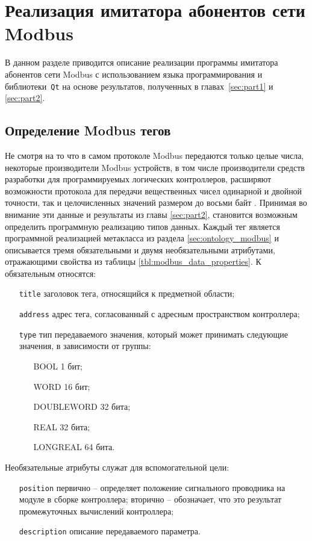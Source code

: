 \chapter{Реализация имитатора абонентов сети Modbus}
В данном разделе приводится описание реализации программы имитатора абонентов сети Modbus
с использованием языка программирования \cpp и библиотеки~\texttt{Qt}
на основе результатов, полученных в главах~\ref{sec:part1} и \ref{sec:part2}.


\section{Определение Modbus тегов} \label{sec:modbus_tag}
Не смотря на то что в самом протоколе Modbus передаются только целые числа, некоторые производители Modbus устройств,
в том числе производители средств разработки для программируемых логических контроллеров, расширяют возможности протокола
для передачи вещественных чисел одинарной и двойной точности, так и целочисленных значений размером до восьми байт \cite{book:gost:modbus_program_language}.
Принимая во внимание эти данные и результаты из главы \ref{sec:part2},
становится возможным определить программную реализацию типов данных.
Каждый тег является программной реализацией метакласса \mbelement из раздела \ref{sec:ontology_modbus}
и описывается тремя обязательными и двумя необязательными атрибутами,
отражающими свойства из таблицы \ref{tbl:modbus_data_properties}.
К обязательным относятся:
\begin{itemize}
    \item[\texttt{title}] заголовок тега, относящийся к предметной области;
    \item[\texttt{address}] адрес тега, согласованный с адресным пространством контроллера;
    \item[\texttt{type}] тип передаваемого значения, который может принимать следующие значения, в зависимости от группы:
    \begin{itemize}
        \item[BOOL] 1 бит;
        \item[WORD] 16 бит;
        \item[DOUBLEWORD] 32 бита;
        \item[REAL] 32 бита;
        \item[LONGREAL] 64 бита.
    \end{itemize}
\end{itemize}
Необязательные атрибуты служат для вспомогательной цели:
\begin{itemize}
    \item[\texttt{position}] первично -- определяет положение сигнального проводника на модуле в сборке контроллера;
    вторично -- обозначает, что это результат промежуточных вычислений контроллера;
    \item[\texttt{description}] описание передаваемого параметра.
\end{itemize}

